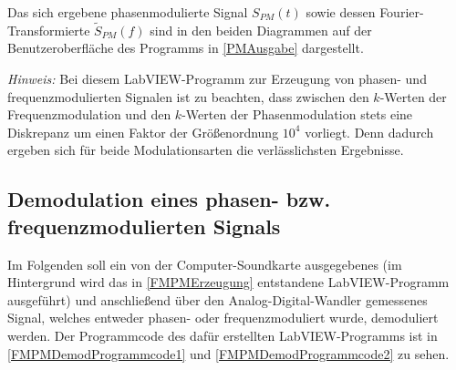 \documentclass[
a4paper,
12pt,
pagesize,
ngerman
]{scrartcl}
\begin{document}
	\noindent Das sich ergebene phasenmodulierte Signal $S_{PM}(t)$ sowie dessen Fourier-Transformierte $\tilde{S}_{PM}(f)$ sind in den beiden Diagrammen auf der Benutzeroberfläche des Programms in \cref{PMAusgabe} dargestellt.
	
	\emph{Hinweis:} Bei diesem LabVIEW-Programm zur Erzeugung von phasen- und frequenzmodulierten Signalen ist zu beachten, dass zwischen den $k$-Werten der Frequenzmodulation und den $k$-Werten der Phasenmodulation stets eine Diskrepanz um einen Faktor der Größenordnung $10^4$ vorliegt.
	Denn dadurch ergeben sich für beide Modulationsarten die verlässlichsten Ergebnisse.
		
	
	
		
	\subsection{Demodulation eines phasen- bzw. frequenzmodulierten Signals} \label{FMPMDemodulation} %
	
	
	Im Folgenden soll ein von der Computer-Soundkarte ausgegebenes (im Hintergrund wird das in \cref{FMPMErzeugung} entstandene LabVIEW-Programm ausgeführt) und anschließend über den Analog-Digital-Wandler gemessenes Signal, welches entweder phasen- oder frequenzmoduliert wurde, demoduliert werden. 
	Der Programmcode des dafür erstellten LabVIEW-Programms ist in \cref{FMPMDemodProgrammcode1} und \cref{FMPMDemodProgrammcode2} zu sehen.
	
\end{document}
